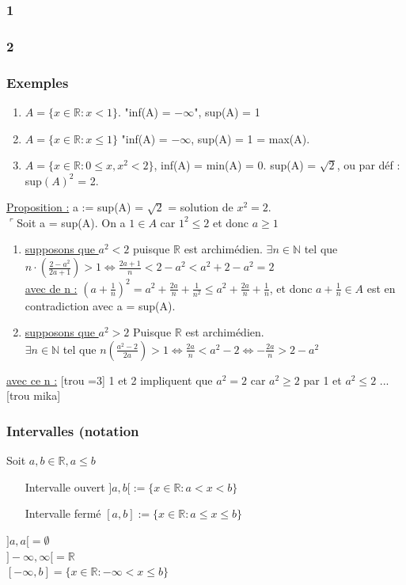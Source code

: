 \documentclass[12pt,a4paper]{article}
\newcommand{\R}{\ensuremath{\mathbb{R}} }
\newcommand{\N}{\ensuremath{\mathbb{N}} }
\begin{document}
\subsubsection{1}
\subsubsection{2}
\subsubsection{Exemples}
\begin{enumerate}
\item $A = \{x \in \R : x < 1\}$. "inf(A) = $-\infty$", sup(A) = 1
\item $A = \{x \in \R : x \leq 1\}$ "inf(A) = $-\infty$, sup(A) = 1 = max(A).
\item $A = \{x \in \R : 0 \leq x, x ^2 < 2\}$, inf(A) = min(A) = 0. sup(A) = $\sqrt{2}$, ou par déf : sup$(A)^2$ = 2.
\end{enumerate}
\underline{Proposition :} a := sup(A) = $\sqrt{2}$ = solution de $x^2 = 2$.\\
$\ulcorner$Soit a = sup(A). On a $1 \in A$ car $1^2 \leq 2$ et donc $a \geq 1$
\begin{enumerate}
\item \underline{supposons que $a^2 < 2$} puisque $\R$ est archimédien. $\exists n \in \N$ tel que $n \cdot (\frac{2-a^2}{2a+1}) > 1 \Leftrightarrow \frac{2a+1}{n} < 2-a^2 < a^2 + 2 - a^2 = 2$\\
\underline{avec de n :} $(a + \frac{1}{n})^2 = a^2 + \frac{2a}{n} + \frac{1}{n^2} \leq a^2 + \frac{2a}{n} + \frac{1}{n}$, et donc $a + \frac{1}{n} \in A$ est en contradiction avec a = sup(A).
\item \underline{supposons que $a^2 > 2$} Puisque $\R$ est archimédien.\\
$\exists n \in \N$ tel que $ n (\frac{a^2 -2}{2a}) > 1 \Leftrightarrow \frac{2a}{n} < a^2 -2 \Leftrightarrow -\frac{2a}{n} > 2-a^2$
\end{enumerate}
\underline{avec ce n :} [trou =3]
1 et 2 impliquent que $a^2 = 2$ car $a^2 \geq 2$ par 1 et $a^2 \leq 2$ ...[trou mika]
\subsubsection{Intervalles (notation}
Soit $a, b \in \R, a \leq b$
\begin{itemize}
\item[Intervalle ouvert] $]a,b[ := \{x \in \R : a < x < b\}$
\item[Intervalle fermé] $[a,b] := \{x \in \R : a \leq x \leq b\}$
\end{itemize}
$]a,a[ = \emptyset$ \\ $]-\infty, \infty[ = \R$ \\ $[-\infty, b] = \{x \in \R : -\infty < x \leq b\}$
\end{document}
